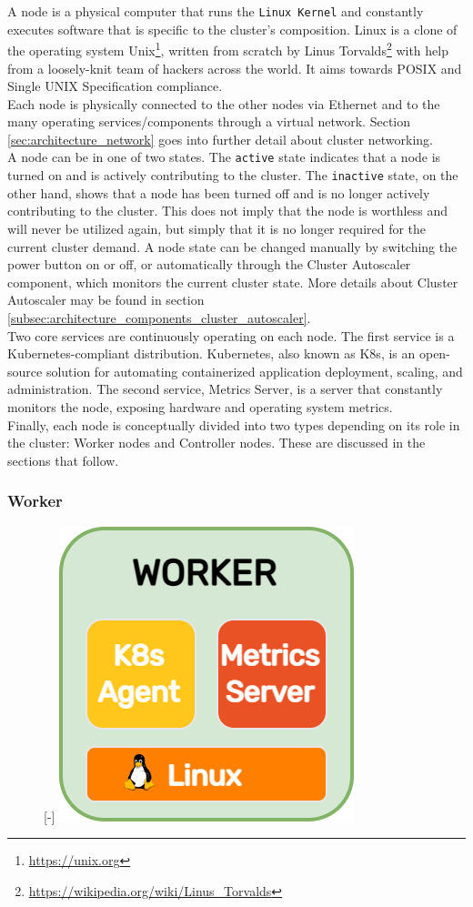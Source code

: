 A node is a physical computer that runs the \texttt{Linux Kernel} and constantly
executes software that is specific to the cluster's composition. Linux is a
clone of the operating system Unix\footnote{\url{https://unix.org}}, written from
scratch by Linus Torvalds\footnote{\url{https://wikipedia.org/wiki/Linus_Torvalds}}
with help from a loosely-knit team of hackers across the world. It aims towards
POSIX and Single UNIX Specification compliance\cite{linux}.\\ %
Each node is physically connected to the other nodes via Ethernet and to the
many operating services/components through a virtual network. Section \ref{sec:architecture_network}
goes into further detail about cluster networking. \\ %
A node can be in one of two states. The \texttt{active} state indicates that a node
is turned on and is actively contributing to the cluster. The \texttt{inactive} state,
on the other hand, shows that a node has been turned off and is no longer actively
contributing to the cluster. This does not imply that the node is worthless and
will never be utilized again, but simply that it is no longer required for the current
cluster demand. A node state can be changed manually by switching the power
button on or off, or automatically through the Cluster Autoscaler component,
which monitors the current cluster state. More details about Cluster Autoscaler may
be found in section \ref{subsec:architecture_components_cluster_autoscaler}. \\ %
Two core services are continuously operating on each node. The first service is
a Kubernetes-compliant distribution. Kubernetes, also known as K8s, is an open-source
solution for automating containerized application deployment, scaling, and administration\cite{k8s}.
The second service, Metrics Server, is a server that constantly monitors the node,
exposing hardware and operating system metrics. \\ %
Finally, each node is conceptually divided into two types depending on its role in
the cluster: Worker nodes and Controller nodes. These are discussed in the sections
that follow.

\subsubsection{Worker}
\label{subsubsec:architecture_components_node_worker}

\begin{figure} %
  \raisebox{0pt}[\dimexpr\height-\baselineskip\relax]{\centering
  \includegraphics[width=.2\textwidth]{images/recluster/worker.png}}
\end{figure}

